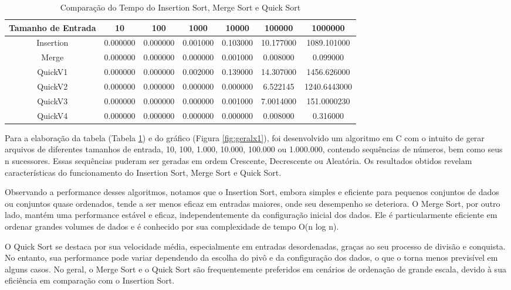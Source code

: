 \begin{table}[h]
    \centering
    \caption{Comparação do Tempo do Insertion Sort, Merge Sort e Quick Sort}
    \begin{tabular}{|c|c|c|c|c|c|c|}
        \hline
        Tamanho de Entrada & 10 & 100 & 1000 & 10000 & 100000 & 1000000 \\
        \hline
        Insertion & 0.000000 & 0.000000 & 0.001000 & 0.103000 & 10.177000 & 1089.101000 \\
        \hline
        Merge & 0.000000 & 0.000000 & 0.000000 & 0.001000 & 0.008000 & 0.099000 \\
        \hline
        QuickV1 & 0.000000 & 0.000000 & 0.002000 & 0.139000 & 14.307000 & 1456.626000 \\
        \hline
        QuickV2 & 0.000000 & 0.000000 & 0.000000 & 0.000000 & 6.522145 & 1240.6443000 \\
        \hline
        QuickV3 & 0.000000 & 0.000000 & 0.000000 & 0.001000 & 7.0014000 & 151.0000230\\
        \hline
        QuickV4 & 0.000000 & 0.000000 & 0.000000 & 0.000000 & 0.008000 & 0.316000 \\
        
        \hline
    \end{tabular}
    \label{tab:geralx}
\end{table}

Para a elaboração da tabela (Tabela \ref{tab:geralx}) e do gráfico (Figura \ref{fig:geralx1}), foi desenvolvido um algoritmo em C com o intuito de gerar arquivos de diferentes tamanhos de entrada, 10, 100, 1.000, 10.000, 100.000 ou 1.000.000, contendo sequências de números, bem como seus n sucessores. Essas sequências puderam ser geradas em ordem Crescente, Decrescente ou Aleatória. Os resultados obtidos revelam características do funcionamento do Insertion Sort, Merge Sort e Quick Sort. 

Observando a performance desses algoritmos, notamos que o Insertion Sort, embora simples e eficiente para pequenos conjuntos de dados ou conjuntos quase ordenados, tende a ser menos eficaz em entradas maiores, onde seu desempenho se deteriora. O Merge Sort, por outro lado, mantém uma performance estável e eficaz, independentemente da configuração inicial dos dados. Ele é particularmente eficiente em ordenar grandes volumes de dados e é conhecido por sua complexidade de tempo O(n log n). 

O Quick Sort se destaca por sua velocidade média, especialmente em entradas desordenadas, graças ao seu processo de divisão e conquista. No entanto, sua performance pode variar dependendo da escolha do pivô e da configuração dos dados, o que o torna menos previsível em alguns casos. No geral, o Merge Sort e o Quick Sort são frequentemente preferidos em cenários de ordenação de grande escala, devido à sua eficiência em comparação com o Insertion Sort.



